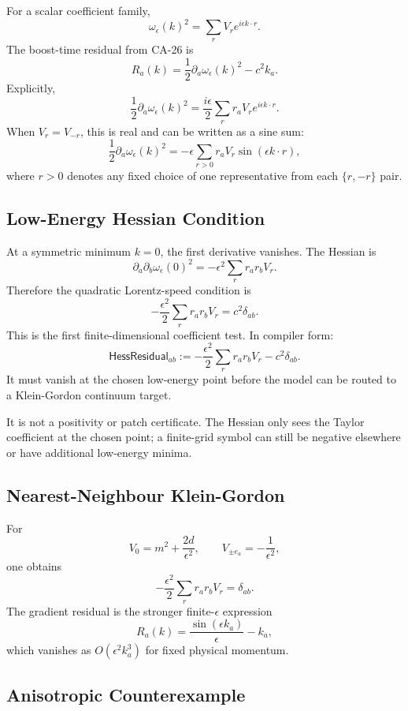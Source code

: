 For a scalar coefficient family,
\[
  \omega_\epsilon(k)^2=\sum_rV_re^{i\epsilon k\cdot r}.
\]
The boost-time residual from CA-26 is
\[
  R_a(k)
  =
  \frac{1}{2}\partial_a\omega_\epsilon(k)^2-c^2k_a.
\]
Explicitly,
\[
  \frac{1}{2}\partial_a\omega_\epsilon(k)^2
  =
  \frac{i\epsilon}{2}\sum_r r_aV_re^{i\epsilon k\cdot r}.
\]
When \(V_r=V_{-r}\), this is real and can be written as a sine sum:
\[
  \frac{1}{2}\partial_a\omega_\epsilon(k)^2
  =
  -\epsilon\sum_{r>0} r_aV_r\sin(\epsilon k\cdot r),
\]
where \(r>0\) denotes any fixed choice of one representative from each
\(\{r,-r\}\) pair.

\subsection{Low-Energy Hessian Condition}

At a symmetric minimum \(k=0\), the first derivative vanishes.  The Hessian is
\[
  \partial_a\partial_b\omega_\epsilon(0)^2
  =
  -\epsilon^2\sum_r r_ar_bV_r.
\]
Therefore the quadratic Lorentz-speed condition is
\[
  -\frac{\epsilon^2}{2}\sum_r r_ar_bV_r
  =
  c^2\delta_{ab}.
\]
This is the first finite-dimensional coefficient test.  In compiler form:
\[
  \mathsf{HessResidual}_{ab}
  :=
  -\frac{\epsilon^2}{2}\sum_r r_ar_bV_r-c^2\delta_{ab}.
\]
It must vanish at the chosen low-energy point before the model can be routed to
a Klein-Gordon continuum target.

It is not a positivity or patch certificate.  The Hessian only sees the Taylor
coefficient at the chosen point; a finite-grid symbol can still be negative
elsewhere or have additional low-energy minima.

\subsection{Nearest-Neighbour Klein-Gordon}

For
\[
  V_0=m^2+\frac{2d}{\epsilon^2},
  \qquad
  V_{\pm e_a}=-\frac{1}{\epsilon^2},
\]
one obtains
\[
  -\frac{\epsilon^2}{2}
  \sum_r r_ar_bV_r
  =
  \delta_{ab}.
\]
The gradient residual is the stronger finite-\(\epsilon\) expression
\[
  R_a(k)=\frac{\sin(\epsilon k_a)}{\epsilon}-k_a,
\]
which vanishes as \(O(\epsilon^2k_a^3)\) for fixed physical momentum.

\subsection{Anisotropic Counterexample}

